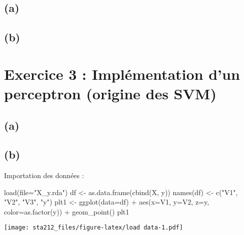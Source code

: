 \documentclass[
]{article}
\newenvironment{Shaded}{\begin{snugshade}}{\end{snugshade}}
\newcommand{\AttributeTok}[1]{\textcolor[rgb]{0.77,0.63,0.00}{#1}}
\newcommand{\FunctionTok}[1]{\textcolor[rgb]{0.00,0.00,0.00}{#1}}
\newcommand{\NormalTok}[1]{#1}
\newcommand{\OtherTok}[1]{\textcolor[rgb]{0.56,0.35,0.01}{#1}}
\newcommand{\SpecialCharTok}[1]{\textcolor[rgb]{0.00,0.00,0.00}{#1}}
\newcommand{\StringTok}[1]{\textcolor[rgb]{0.31,0.60,0.02}{#1}}
\begin{document}
\hypertarget{a-1}{%
\subsection{(a)}\label{a-1}}

\hypertarget{b-1}{%
\subsection{(b)}\label{b-1}}

\hypertarget{exercice-3-impluxe9mentation-dun-perceptron-origine-des-svm}{%
\section{Exercice 3 : Implémentation d'un perceptron (origine des
SVM)}\label{exercice-3-impluxe9mentation-dun-perceptron-origine-des-svm}}

\hypertarget{a-2}{%
\subsection{(a)}\label{a-2}}

\hypertarget{b-2}{%
\subsection{(b)}\label{b-2}}

Importation des données :

\begin{Shaded}
\begin{Highlighting}[]
\FunctionTok{load}\NormalTok{(}\AttributeTok{file=}\StringTok{"X\_y.rda"}\NormalTok{)}
\NormalTok{df }\OtherTok{\textless{}{-}} \FunctionTok{as.data.frame}\NormalTok{(}\FunctionTok{cbind}\NormalTok{(X, y))}
\FunctionTok{names}\NormalTok{(df) }\OtherTok{\textless{}{-}} \FunctionTok{c}\NormalTok{(}\StringTok{"V1"}\NormalTok{, }\StringTok{"V2"}\NormalTok{, }\StringTok{"V3"}\NormalTok{, }\StringTok{"y"}\NormalTok{)}
\NormalTok{plt1 }\OtherTok{\textless{}{-}} \FunctionTok{ggplot}\NormalTok{(}\AttributeTok{data=}\NormalTok{df) }\SpecialCharTok{+} \FunctionTok{aes}\NormalTok{(}\AttributeTok{x=}\NormalTok{V1, }\AttributeTok{y=}\NormalTok{V2, }\AttributeTok{z=}\NormalTok{y, }\AttributeTok{color=}\FunctionTok{as.factor}\NormalTok{(y)) }\SpecialCharTok{+} \FunctionTok{geom\_point}\NormalTok{()}
\NormalTok{plt1}
\end{Highlighting}
\end{Shaded}

\texttt{[image: sta212\_files/figure-latex/load data-1.pdf]}
\end{document}
